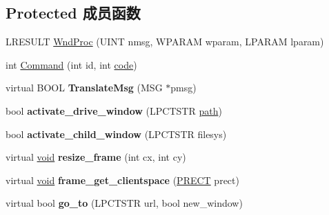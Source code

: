 \subsection*{Protected 成员函数}
\begin{DoxyCompactItemize}
\item 
L\+R\+E\+S\+U\+LT \hyperlink{struct_m_d_i_main_frame_a813007858144546db05a679773c7cda7}{Wnd\+Proc} (U\+I\+NT nmsg, W\+P\+A\+R\+AM wparam, L\+P\+A\+R\+AM lparam)
\item 
int \hyperlink{struct_m_d_i_main_frame_a96be11d77604f4dc731c486a7926f8a1}{Command} (int id, int \hyperlink{structcode}{code})
\item 
\mbox{\label{struct_m_d_i_main_frame_a39098bae21cffa098b8fcb47586b276d}} 
virtual B\+O\+OL {\bfseries Translate\+Msg} (M\+SG $\ast$pmsg)
\item 
\mbox{\label{struct_m_d_i_main_frame_ab1399f441276d7f99350766a3b2c6ccf}} 
bool {\bfseries activate\+\_\+drive\+\_\+window} (L\+P\+C\+T\+S\+TR \hyperlink{structpath}{path})
\item 
\mbox{\label{struct_m_d_i_main_frame_a23566c87f1345614ddf117a5ac4a387d}} 
bool {\bfseries activate\+\_\+child\+\_\+window} (L\+P\+C\+T\+S\+TR filesys)
\item 
\mbox{\label{struct_m_d_i_main_frame_ab1a12d0bd564da03749e89472cd1da04}} 
virtual \hyperlink{interfacevoid}{void} {\bfseries resize\+\_\+frame} (int cx, int cy)
\item 
\mbox{\label{struct_m_d_i_main_frame_a2f7bed804aa33794110478e99ea12fe1}} 
virtual \hyperlink{interfacevoid}{void} {\bfseries frame\+\_\+get\+\_\+clientspace} (\hyperlink{structtag_r_e_c_t}{P\+R\+E\+CT} prect)
\item 
\mbox{\label{struct_m_d_i_main_frame_af4e4e78b7b15dc3db51a6eb57ee162b7}} 
virtual bool {\bfseries go\+\_\+to} (L\+P\+C\+T\+S\+TR url, bool new\+\_\+window)
\end{DoxyCompactItemize}
